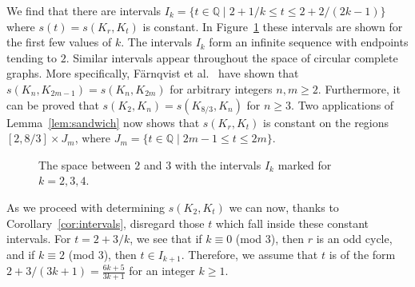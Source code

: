 \documentclass[11pt,a4paper]{article}
\begin{document}
We find that there are intervals $I_k = \{ t \in \mathbb{Q} \;|\; 2+1/k \leq t \leq 2+2/(2k-1) \}$ where $s(t) = s(K_r, K_{t})$ is constant.
In Figure~\ref{fig:interval} these intervals are shown for the first few values of $k$. The intervals $I_k$ form an infinite sequence with endpoints tending to $2$. 
Similar intervals appear throughout the space of circular complete graphs.
More specifically,  F\"{a}rnqvist et al.~\cite{farnqvist:etal:09} have shown
that $s(K_n,K_{2m-1}) = s(K_n,K_{2m})$ for arbitrary integers $n, m \geq 2$.
Furthermore, it can be proved that $s(K_2, K_n) = s(K_{8/3}, K_n)$ for $n \geq 3$.
Two applications of Lemma~\ref{lem:sandwich} now shows that $s(K_r, K_{t})$ is 
constant on the regions $[2, 8/3] \times J_m$, where
  $J_m = \{ t \in \mathbb{Q} \;|\; 2m-1 \leq t \leq 2m \}$.

\begin{figure}[h]
\centering
{}
\caption{The space between $2$ and $3$ with the intervals $I_k$ marked for $k = 2, 3, 4$.}\label{fig:interval}
\end{figure}

As we proceed with determining $s(K_2, K_{t})$ we can now, 
thanks to Corollary~\ref{cor:intervals}, disregard those $t$ which fall
inside these constant intervals.
For $t = 2 + 3/k$, we see that if
$k \equiv 0 $ (mod 3), then $r$ is an odd cycle,
and if $k \equiv 2 $ (mod 3), then $t \in I_{k+1}$.
Therefore, we assume that $t$ is of the form 
$2+3/(3k+1) = \frac{6k+5}{3k+1}$ for an integer $k \geq 1$.
\end{document}
